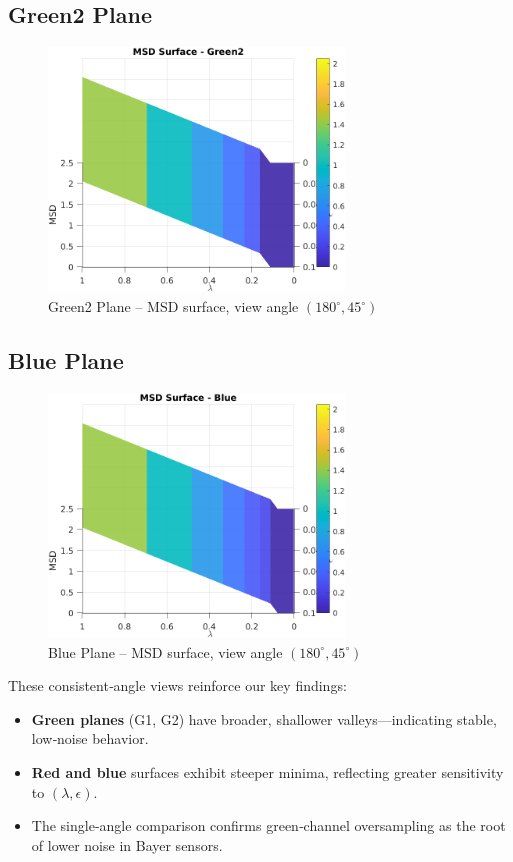 \documentclass[11pt]{article}
\begin{document}
\subsection*{Green2 Plane}
\begin{figure}[h!]
\centering
\includegraphics[width=0.7\textwidth]{../utils/results/msd_surfaces/msd_surface_green2_angle_180_45.png}
\caption{Green2 Plane – MSD surface, view angle $(180^\circ,45^\circ)$}
\end{figure}
\clearpage

\subsection*{Blue Plane}
\begin{figure}[h!]
\centering
\includegraphics[width=0.7\textwidth]{../utils/results/msd_surfaces/msd_surface_blue_angle_180_45.png}
\caption{Blue Plane – MSD surface, view angle $(180^\circ,45^\circ)$}
\end{figure}
\clearpage

\noindent These consistent‐angle views reinforce our key findings:
\begin{itemize}
  \item \textbf{Green planes} (G1, G2) have broader, shallower valleys—indicating stable, low‐noise behavior.
  \item \textbf{Red and blue} surfaces exhibit steeper minima, reflecting greater sensitivity to \((\lambda,\epsilon)\).
  \item The single‐angle comparison confirms green‐channel oversampling as the root of lower noise in Bayer sensors.
\end{itemize}
\end{document}
